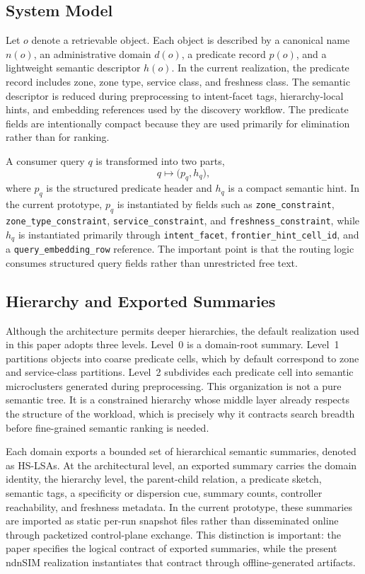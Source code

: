 \documentclass[journal]{IEEEtran}
\newcommand{\hslsa}{HS-LSA}
\begin{document}
\subsection{System Model}

Let $o$ denote a retrievable object. Each object is described by a canonical name $n(o)$, an administrative domain $d(o)$, a predicate record $p(o)$, and a lightweight semantic descriptor $h(o)$. In the current realization, the predicate record includes zone, zone type, service class, and freshness class. The semantic descriptor is reduced during preprocessing to intent-facet tags, hierarchy-local hints, and embedding references used by the discovery workflow. The predicate fields are intentionally compact because they are used primarily for elimination rather than for ranking.

A consumer query $q$ is transformed into two parts,
\begin{equation}
q \mapsto \bigl(p_q,h_q\bigr),
\end{equation}
where $p_q$ is the structured predicate header and $h_q$ is a compact semantic hint. In the current prototype, $p_q$ is instantiated by fields such as \texttt{zone\_constraint}, \texttt{zone\_type\_constraint}, \texttt{service\_constraint}, and \texttt{freshness\_constraint}, while $h_q$ is instantiated primarily through \texttt{intent\_facet}, \texttt{frontier\_hint\_cell\_id}, and a \texttt{query\_embedding\_row} reference. The important point is that the routing logic consumes structured query fields rather than unrestricted free text.

\subsection{Hierarchy and Exported Summaries}

Although the architecture permits deeper hierarchies, the default realization used in this paper adopts three levels. Level~0 is a domain-root summary. Level~1 partitions objects into coarse predicate cells, which by default correspond to zone and service-class partitions. Level~2 subdivides each predicate cell into semantic microclusters generated during preprocessing. This organization is not a pure semantic tree. It is a constrained hierarchy whose middle layer already respects the structure of the workload, which is precisely why it contracts search breadth before fine-grained semantic ranking is needed.

Each domain exports a bounded set of hierarchical semantic summaries, denoted as \hslsa{}s. At the architectural level, an exported summary carries the domain identity, the hierarchy level, the parent-child relation, a predicate sketch, semantic tags, a specificity or dispersion cue, summary counts, controller reachability, and freshness metadata. In the current prototype, these summaries are imported as static per-run snapshot files rather than disseminated online through packetized control-plane exchange. This distinction is important: the paper specifies the logical contract of exported summaries, while the present ndnSIM realization instantiates that contract through offline-generated artifacts.
\end{document}
